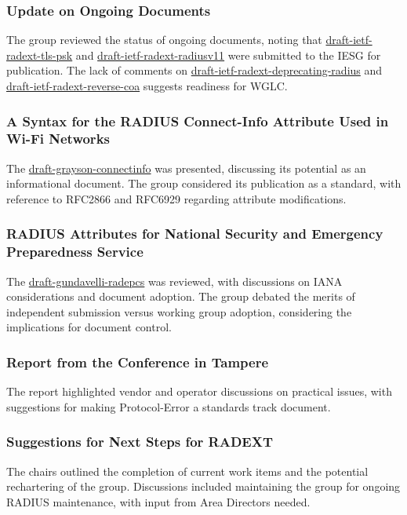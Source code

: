 \documentclass{article}
\begin{document}
\subsubsection{Update on Ongoing Documents}
The group reviewed the status of ongoing documents, noting that \href{https://datatracker.ietf.org/doc/html/draft-ietf-radext-tls-psk}{draft-ietf-radext-tls-psk} and \href{https://datatracker.ietf.org/doc/html/draft-ietf-radext-radiusv11}{draft-ietf-radext-radiusv11} were submitted to the IESG for publication. The lack of comments on \href{https://datatracker.ietf.org/doc/html/draft-ietf-radext-deprecating-radius}{draft-ietf-radext-deprecating-radius} and \href{https://datatracker.ietf.org/doc/html/draft-ietf-radext-reverse-coa}{draft-ietf-radext-reverse-coa} suggests readiness for WGLC.

\subsubsection{A Syntax for the RADIUS Connect-Info Attribute Used in Wi-Fi Networks}
The \href{https://datatracker.ietf.org/doc/html/draft-grayson-connectinfo}{draft-grayson-connectinfo} was presented, discussing its potential as an informational document. The group considered its publication as a standard, with reference to RFC2866 and RFC6929 regarding attribute modifications.

\subsubsection{RADIUS Attributes for National Security and Emergency Preparedness Service}
The \href{https://datatracker.ietf.org/doc/html/draft-gundavelli-radepcs}{draft-gundavelli-radepcs} was reviewed, with discussions on IANA considerations and document adoption. The group debated the merits of independent submission versus working group adoption, considering the implications for document control.

\subsubsection{Report from the Conference in Tampere}
The report highlighted vendor and operator discussions on practical issues, with suggestions for making Protocol-Error a standards track document.

\subsubsection{Suggestions for Next Steps for RADEXT}
The chairs outlined the completion of current work items and the potential rechartering of the group. Discussions included maintaining the group for ongoing RADIUS maintenance, with input from Area Directors needed.
\end{document}
